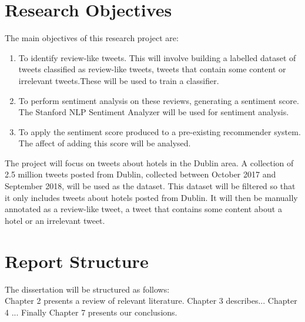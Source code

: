 \section{Research Objectives}
The main objectives of this research project are:
\begin{enumerate}
    \item To identify review-like tweets. This will involve building a labelled dataset of tweets classified as review-like tweets, tweets that contain some content or irrelevant tweets.These will be used to train a classifier.
    \item To perform sentiment analysis on these reviews, generating a sentiment score. The Stanford NLP Sentiment Analyzer will be used for sentiment analysis. 
    \item To apply the sentiment score produced to a pre-existing recommender system. The affect of adding this score will be analysed.
\end{enumerate}
The project will focus on tweets about hotels in the Dublin area. A collection of 2.5 million tweets posted from Dublin, collected between October 2017 and September 2018, will be used as the dataset. This dataset will be filtered so that it only includes tweets about hotels posted from Dublin. It will then be manually annotated as a review-like tweet, a tweet that contains some content about a hotel or an irrelevant tweet.

\section{Report Structure}
The dissertation will be structured as follows:\\
Chapter 2 presents a review of relevant literature. Chapter 3 describes... Chapter 4 ... Finally Chapter 7 presents our conclusions.